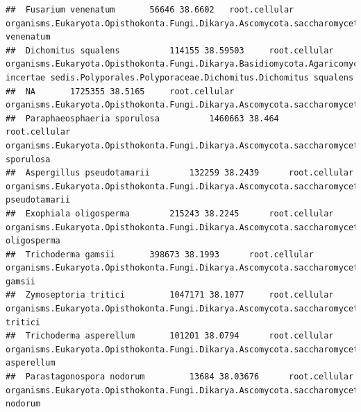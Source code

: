 \documentclass{article}\usepackage[]{graphicx}\usepackage[]{color}
\makeatletter
\newenvironment{kframe}{%
 \def\at@end@of@kframe{}%
 \ifinner\ifhmode%
  \def\at@end@of@kframe{\end{minipage}}%
  \begin{minipage}{\columnwidth}%
 \fi\fi%
 \def\FrameCommand##1{\hskip\@totalleftmargin \hskip-\fboxsep
 \colorbox{shadecolor}{##1}\hskip-\fboxsep
     \hskip-\linewidth \hskip-\@totalleftmargin \hskip\columnwidth}%
 \MakeFramed {\advance\hsize-\width
   \@totalleftmargin\z@ \linewidth\hsize
   \@setminipage}}%
 {\par\unskip\endMakeFramed%
 \at@end@of@kframe}
\newenvironment{knitrout}{}{} %
\makeatother
\begin{document}
\begin{knitrout}
\begin{kframe}
\begin{verbatim}
##  Fusarium venenatum 		 56646 38.6602 	 root.cellular organisms.Eukaryota.Opisthokonta.Fungi.Dikarya.Ascomycota.saccharomyceta.Pezizomycotina.leotiomyceta.sordariomyceta.Sordariomycetes.Hypocreomycetidae.Hypocreales.Nectriaceae.Fusarium.NA.Fusarium venenatum
##  Dichomitus squalens 		 114155 38.59503 	 root.cellular organisms.Eukaryota.Opisthokonta.Fungi.Dikarya.Basidiomycota.Agaricomycotina.Agaricomycetes.Agaricomycetes incertae sedis.Polyporales.Polyporaceae.Dichomitus.Dichomitus squalens
##  NA 		 1725355 38.5165 	 root.cellular organisms.Eukaryota.Opisthokonta.Fungi.Dikarya.Ascomycota.saccharomyceta.Saccharomycotina.Saccharomycetes.Saccharomycetales.Saccharomycopsidaceae.Saccharomycopsis.NA
##  Paraphaeosphaeria sporulosa 		 1460663 38.464 	 root.cellular organisms.Eukaryota.Opisthokonta.Fungi.Dikarya.Ascomycota.saccharomyceta.Pezizomycotina.leotiomyceta.dothideomyceta.Dothideomycetes.Pleosporomycetidae.Pleosporales.Massarineae.Didymosphaeriaceae.Paraphaeosphaeria.Paraphaeosphaeria sporulosa
##  Aspergillus pseudotamarii 		 132259 38.2439 	 root.cellular organisms.Eukaryota.Opisthokonta.Fungi.Dikarya.Ascomycota.saccharomyceta.Pezizomycotina.leotiomyceta.Eurotiomycetes.Eurotiomycetidae.Eurotiales.Aspergillaceae.Aspergillus.Aspergillus pseudotamarii
##  Exophiala oligosperma 		 215243 38.2245 	 root.cellular organisms.Eukaryota.Opisthokonta.Fungi.Dikarya.Ascomycota.saccharomyceta.Pezizomycotina.leotiomyceta.Eurotiomycetes.Chaetothyriomycetidae.Chaetothyriales.Herpotrichiellaceae.Exophiala.Exophiala oligosperma
##  Trichoderma gamsii 		 398673 38.1993 	 root.cellular organisms.Eukaryota.Opisthokonta.Fungi.Dikarya.Ascomycota.saccharomyceta.Pezizomycotina.leotiomyceta.sordariomyceta.Sordariomycetes.Hypocreomycetidae.Hypocreales.Hypocreaceae.Trichoderma.Trichoderma gamsii
##  Zymoseptoria tritici 		 1047171 38.1077 	 root.cellular organisms.Eukaryota.Opisthokonta.Fungi.Dikarya.Ascomycota.saccharomyceta.Pezizomycotina.leotiomyceta.dothideomyceta.Dothideomycetes.Dothideomycetidae.Capnodiales.Mycosphaerellaceae.Zymoseptoria.Zymoseptoria tritici
##  Trichoderma asperellum 		 101201 38.0794 	 root.cellular organisms.Eukaryota.Opisthokonta.Fungi.Dikarya.Ascomycota.saccharomyceta.Pezizomycotina.leotiomyceta.sordariomyceta.Sordariomycetes.Hypocreomycetidae.Hypocreales.Hypocreaceae.Trichoderma.Trichoderma asperellum
##  Parastagonospora nodorum 		 13684 38.03676 	 root.cellular organisms.Eukaryota.Opisthokonta.Fungi.Dikarya.Ascomycota.saccharomyceta.Pezizomycotina.leotiomyceta.dothideomyceta.Dothideomycetes.Pleosporomycetidae.Pleosporales.Pleosporineae.Phaeosphaeriaceae.Parastagonospora.Parastagonospora nodorum

\end{verbatim}
\end{kframe}
\end{knitrout}
\end{document}
